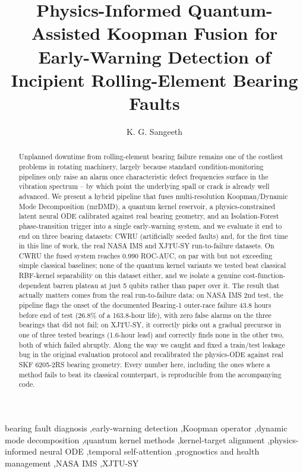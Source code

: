 \documentclass[3p,times,procedia]{elsarticle}
\begin{document}
\begin{frontmatter}

\title{Physics-Informed Quantum-Assisted Koopman Fusion for Early-Warning Detection of Incipient Rolling-Element Bearing Faults}

\author[a]{K. G. Sangeeth}
\address[a]{Amrita School of Engineering, Amrita Vishwa Vidyapeetham, Coimbatore — 641112}

\begin{abstract}
Unplanned downtime from rolling-element bearing failure remains one of the costliest problems in rotating machinery, largely because standard condition-monitoring pipelines only raise an alarm once characteristic defect frequencies surface in the vibration spectrum -- by which point the underlying spall or crack is already well advanced. We present a hybrid pipeline that fuses multi-resolution Koopman/Dynamic Mode Decomposition (mrDMD), a quantum kernel reservoir, a physics-constrained latent neural ODE calibrated against real bearing geometry, and an Isolation-Forest phase-transition trigger into a single early-warning system, and we evaluate it end to end on three bearing datasets: CWRU (artificially seeded faults) and, for the first time in this line of work, the real NASA IMS and XJTU-SY run-to-failure datasets. On CWRU the fused system reaches 0.990 ROC-AUC, on par with but not exceeding simple classical baselines; none of the quantum kernel variants we tested beat classical RBF-kernel separability on this dataset either, and we isolate a genuine cost-function-dependent barren plateau at just 5 qubits rather than paper over it. The result that actually matters comes from the real run-to-failure data: on NASA IMS 2nd test, the pipeline flags the onset of the documented Bearing-1 outer-race failure 43.8 hours before end of test (26.8\% of a 163.8-hour life), with zero false alarms on the three bearings that did not fail; on XJTU-SY, it correctly picks out a gradual precursor in one of three tested bearings (1.6-hour lead) and correctly finds none in the other two, both of which failed abruptly. Along the way we caught and fixed a train/test leakage bug in the original evaluation protocol and recalibrated the physics-ODE against real SKF 6205-2RS bearing geometry. Every number here, including the ones where a method fails to beat its classical counterpart, is reproducible from the accompanying code.
\end{abstract}

\begin{keyword}
bearing fault diagnosis \sep early-warning detection \sep Koopman operator \sep dynamic mode decomposition \sep quantum kernel methods \sep kernel-target alignment \sep physics-informed neural ODE \sep temporal self-attention \sep prognostics and health management \sep NASA IMS \sep XJTU-SY
\end{keyword}
\end{frontmatter}
\end{document}
